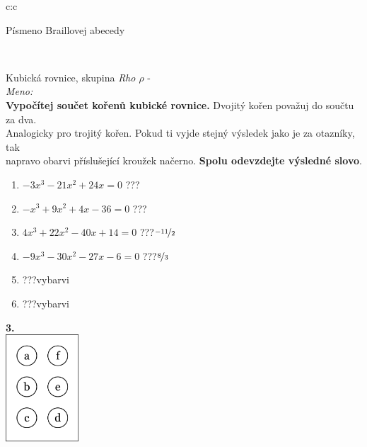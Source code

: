 \documentclass[10pt]{report}
\begin{document}
\begin{tabular}{c:c}
\begin{minipage}[c][99mm][t]{0.49\linewidth}
\begin{center}
\begin{minipage}{0.20\linewidth}
\begin{center}
{\small Písmeno Braillovej abecedy}
\end{center}
\end{minipage}
\end{center}
\end{minipage}
\\ \hdashline
\begin{minipage}[c][99mm][t]{0.49\linewidth}
\begin{center}
\vspace{7mm}
{\huge Kubická rovnice, skupina \textit{Rho $\rho$} -}\\[4.5mm]
\textit{Meno:}\phantom{xxxxxxxxxxxxxxxxxxxxxxxxxxxxxxxxxxxxxxxxxxxxxxxxxxxxxxxxxxxxxxxxx}\\[3.5mm]
\textbf{Vypočítej součet kořenů kubické rovnice.} Dvojitý kořen považuj do součtu za dva.\\Analogicky pro trojitý kořen. Pokud ti vyjde stejný výsledek jako je za otazníky, tak\\napravo obarvi příslušející kroužek načerno. \textbf{Spolu odevzdejte výsledné slovo}.\\[3mm]
\begin{minipage}{0.77\linewidth}
\begin{center}
\begin{varwidth}{\textwidth}
\begin{enumerate}
\large
\item $-3x^3-21x^2+24x=0$\quad \dotfill\; ???\;\dotfill {}
\item $-x^3+9x^2+4x-36=0$\quad \dotfill\; ???\;\dotfill {}
\item $4x^3+22x^2-40x+14=0$\quad \dotfill\; ???\;\dotfill \quad $\nicefrac{-11}{2}$
\item $-9x^3-30x^2-27x-6=0$\quad \dotfill\; ???\;\dotfill \quad $\nicefrac{8}{3}$
\item \quad \dotfill\; ???\;\dotfill \quad vybarvi
\item \quad \dotfill\; ???\;\dotfill \quad vybarvi
\end{enumerate}
\end{varwidth}
\end{center}
\end{minipage}
\begin{minipage}{0.20\linewidth}
\begin{center}
{\Huge\bfseries 3.} \\[2mm]
\includegraphics[height=40mm]{../images/braille.png}

\end{center}
\end{minipage}
\end{center}
\end{minipage}
\end{tabular}
\end{document}
